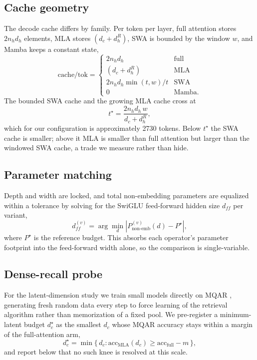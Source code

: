 \documentclass[conference]{IEEEtran}
\begin{document}
\subsection{Cache geometry}
The decode cache differs by family. Per token per layer, full attention stores $2 n_h d_h$ elements, MLA stores $(d_c + d_h^R)$, SWA is bounded by the window $w$, and Mamba keeps a constant state,
\begin{equation}
\mathrm{cache}/\mathrm{tok} =
\begin{cases}
2 n_h d_h & \text{full} \\
(d_c + d_h^R) & \text{MLA} \\
2 n_h d_h \min(t, w) / t & \text{SWA} \\
0 & \text{Mamba}.
\end{cases}
\end{equation}
The bounded SWA cache and the growing MLA cache cross at
\begin{equation}
t^\star = \frac{2 n_h d_h\, w}{d_c + d_h^R},
\label{eq:crossover}
\end{equation}
which for our configuration is approximately 2730 tokens. Below $t^\star$ the SWA cache is smaller; above it MLA is smaller than full attention but larger than the windowed SWA cache, a trade we measure rather than hide.

\subsection{Parameter matching}
Depth and width are locked, and total non-embedding parameters are equalized within a tolerance by solving for the SwiGLU feed-forward hidden size $d_{ff}$ per variant,
\begin{equation}
d_{ff}^{(v)} = \arg\min_{d} \left| P_{\text{non-emb}}^{(v)}(d) - P^{\star} \right|,
\end{equation}
where $P^{\star}$ is the reference budget. This absorbs each operator's parameter footprint into the feed-forward width alone, so the comparison is single-variable.

\subsection{Dense-recall probe}
For the latent-dimension study we train small models directly on MQAR \cite{zoology}, generating fresh random data every step to force learning of the retrieval algorithm rather than memorization of a fixed pool. We pre-register a minimum-latent budget $d_c^\star$ as the smallest $d_c$ whose MQAR accuracy stays within a margin of the full-attention arm,
\begin{equation}
d_c^\star = \min\{\, d_c : \mathrm{acc}_{\text{MLA}}(d_c) \ge \mathrm{acc}_{\text{full}} - m \,\},
\label{eq:dcstar}
\end{equation}
and report below that no such knee is resolved at this scale.
\end{document}
